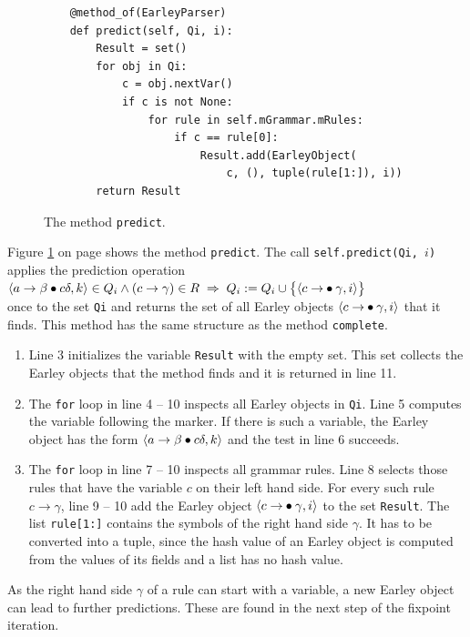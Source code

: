\begin{figure}[!ht]
\centering
\begin{verbatim}
    @method_of(EarleyParser)
    def predict(self, Qi, i):
        Result = set()
        for obj in Qi:
            c = obj.nextVar()
            if c is not None:
                for rule in self.mGrammar.mRules:
                    if c == rule[0]:
                        Result.add(EarleyObject(
                            c, (), tuple(rule[1:]), i))
        return Result
\end{verbatim}
\vspace*{-0.3cm}
\caption{The method \texttt{predict}.}
\label{fig:01-Earley-Parser.ipynb:predict}
\end{figure}

\noindent
Figure \ref{fig:01-Earley-Parser.ipynb:predict} on page \pageref{fig:01-Earley-Parser.ipynb:predict} shows the
method \texttt{predict}.  The call \texttt{self.predict(Qi,~$i$)} applies the prediction operation
\\[0.2cm]
\hspace*{1.3cm}
$\pair(a \rightarrow \beta \mdot c \delta, k) \in Q_i
 \wedge (c \rightarrow \gamma) \in R
 \;\Rightarrow\;
 Q_i := Q_i \cup\bigl\{ \pair(c \rightarrow \mdot\gamma, i)\bigr\}$
\\[0.2cm]
once to the set \texttt{Qi} and returns the set of all Earley objects $\pair(c \rightarrow \mdot\gamma, i)$ that it
finds.  This method has the same structure as the method \texttt{complete}.
\begin{enumerate}
\item Line 3 initializes the variable \texttt{Result} with the empty set.  This set collects the Earley objects
      that the method finds and it is returned in line 11.
\item The \texttt{for} loop in line 4 -- 10 inspects all Earley objects in \texttt{Qi}.  Line 5 computes the variable
      following the marker.  If there is such a variable, the Earley object has the form
      $\pair(a \rightarrow \beta \mdot c \delta, k)$ and the test in line 6 succeeds.
\item The \texttt{for} loop in line 7 -- 10 inspects all grammar rules.  Line 8 selects those rules that have
      the variable $c$ on their left hand side.  For every such rule $c \rightarrow \gamma$, line 9 -- 10 add the
      Earley object $\pair(c \rightarrow \mdot\gamma, i)$ to the set \texttt{Result}.  The list \texttt{rule[1:]}
      contains the symbols of the right hand side $\gamma$.  It has to be converted into a tuple, since the hash value
      of an Earley object is computed from the values of its fields and a list has no hash value.
\end{enumerate}
As the right hand side $\gamma$ of a rule can start with a variable, a new Earley object can lead to further
predictions.  These are found in the next step of the fixpoint iteration.

